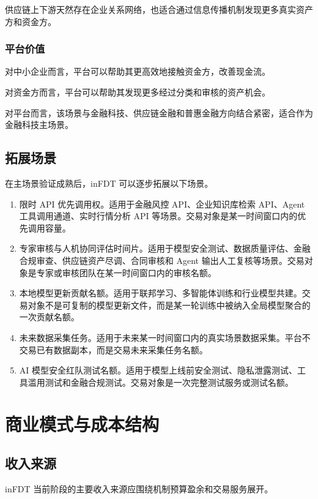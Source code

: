 \documentclass[UTF8,a4paper,12pt]{ctexart}
\begin{document}
供应链上下游天然存在企业关系网络，也适合通过信息传播机制发现更多真实资产方和资金方。

\subsubsection*{平台价值}

对中小企业而言，平台可以帮助其更高效地接触资金方，改善现金流。

对资金方而言，平台可以帮助其发现更多经过分类和审核的资产机会。

对平台而言，该场景与金融科技、供应链金融和普惠金融方向结合紧密，适合作为金融科技主场景。

\subsection{拓展场景}

在主场景验证成熟后，inFDT 可以逐步拓展以下场景。

\begin{enumerate}
    \item 限时 API 优先调用权。适用于金融风控 API、企业知识库检索 API、Agent 工具调用通道、实时行情分析 API 等场景。交易对象是某一时间窗口内的优先调用容量。
    \item 专家审核与人机协同评估时间片。适用于模型安全测试、数据质量评估、金融合规审查、供应链资产尽调、合同审核和 Agent 输出人工复核等场景。交易对象是专家或审核团队在某一时间窗口内的审核名额。
    \item 本地模型更新贡献名额。适用于联邦学习、多智能体训练和行业模型共建。交易对象不是可复制的模型更新文件，而是某一轮训练中被纳入全局模型聚合的一次贡献名额。
    \item 未来数据采集任务。适用于未来某一时间窗口内的真实场景数据采集。平台不交易已有数据副本，而是交易未来采集任务名额。
    \item AI 模型安全红队测试名额。适用于模型上线前安全测试、隐私泄露测试、工具滥用测试和金融合规测试。交易对象是一次完整测试服务或测试名额。
\end{enumerate}


\section{商业模式与成本结构}

\subsection{收入来源}

inFDT 当前阶段的主要收入来源应围绕机制预算盈余和交易服务展开。
\end{document}
